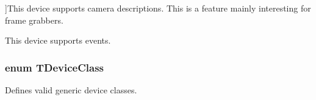 \begin{Desc}
\begin{description}
{}]This device supports camera descriptions. This is a feature mainly interesting for frame grabbers. \item[{\em 
\hypertarget{group___common_interface_ggab025951bf5eb52c67790e7ecd197b76ead689cb11634c6c12f52870c05789744a}{dc\+Event\+Support}\label{group___common_interface_ggab025951bf5eb52c67790e7ecd197b76ead689cb11634c6c12f52870c05789744a}
}]This device supports events. \end{description}
\end{Desc}
\hypertarget{group___common_interface_ga9f8cbab52f6b995214e7ac4bc56bc11a}{
\subsubsection[{T\+Device\+Class}]{\setlength{\rightskip}{0pt plus 5cm}enum {\bf T\+Device\+Class}}}\label{group___common_interface_ga9f8cbab52f6b995214e7ac4bc56bc11a}


Defines valid generic device classes. 

